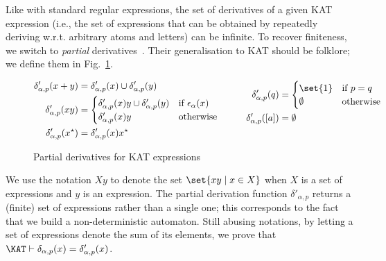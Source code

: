 \documentclass[a4paper]{llncs}
\begin{document}
Like with standard regular expressions, the set of derivatives of a
given KAT expression (i.e., the set of expressions that can be
obtained by repeatedly deriving w.r.t. arbitrary atoms and letters)
can be infinite. To recover finiteness, we switch to \emph{partial}
derivatives~\cite{Antimirov96}. Their generalisation to KAT should be
folklore; we define them in Fig.~\ref{fig:kat:pderiv}.
\begin{figure}[t]
  \centering
  \begin{align*}
    \begin{aligned}
      \delta'_{\alpha,p}(x+y) &= \delta'_{\alpha,p}(x)\cup \delta'_{\alpha,p}(y) \\
      \delta'_{\alpha,p}(x y) &=
      \begin{cases}
        \delta'_{\alpha,p}(x) y \cup
        \delta'_{\alpha,p}(y)&\text{if }\epsilon_\alpha(x)\\
        \delta'_{\alpha,p}(x) y &\text{otherwise}
      \end{cases}\\
      \delta'_{\alpha,p}(x^\star) &= \delta'_{\alpha,p}(x) x^\star\\
    \end{aligned}&&\qquad
    \begin{aligned}
      \delta'_{\alpha,p}(q) &=
      \begin{cases}
        \set{1} & \text{if }p=q\\
        \emptyset & \text{otherwise}
      \end{cases}\\
      \delta'_{\alpha,p}([a]) &= \emptyset\\\\
    \end{aligned}
  \end{align*}
  \vspace{-1em}
  \caption{Partial derivatives for KAT expressions}
\label{fig:kat:pderiv}
\end{figure}
We use the notation $Xy$ to denote the set $\set{xy\mid x\in X}$ when
$X$ is a set of expressions and $y$ is an expression. The partial
derivation function $\delta'_{\alpha,p}$ returns a (finite) set of
expressions rather than a single one; this corresponds to the fact
that we build a non-deterministic automaton. Still abusing notations,
by letting a set of expressions denote the sum of its elements,
we prove that $\KAT\vdash\delta_{\alpha,p}(x) =
\delta'_{\alpha,p}(x)$.

\medskip
\end{document}
